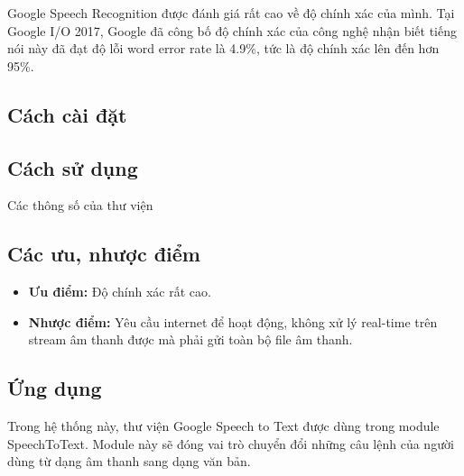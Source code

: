 Google Speech Recognition được đánh giá rất cao về độ chính xác của mình. Tại Google I/O 2017, Google đã công bố độ chính xác của công nghệ nhận biết tiếng nói này đã đạt độ lỗi word error rate là 4.9\%\cite{protalinski}, tức là độ chính xác lên đến hơn 95\%.

\subsection{Cách cài đặt}

\subsection{Cách sử dụng}

Các thông số của thư viện

\subsection{Các ưu, nhược điểm}

\begin{itemize}
    \item \textbf{Ưu điểm:} Độ chính xác rất cao.
    \item \textbf{Nhược điểm:} Yêu cầu internet để hoạt động, không xử lý real-time trên stream âm thanh được mà phải gửi toàn bộ file âm thanh.
\end{itemize}

\subsection{Ứng dụng}

Trong hệ thống này, thư viện Google Speech to Text được dùng trong module SpeechToText. Module này sẽ đóng vai trò chuyển đổi những câu lệnh của người dùng từ dạng âm thanh sang dạng văn bản.
